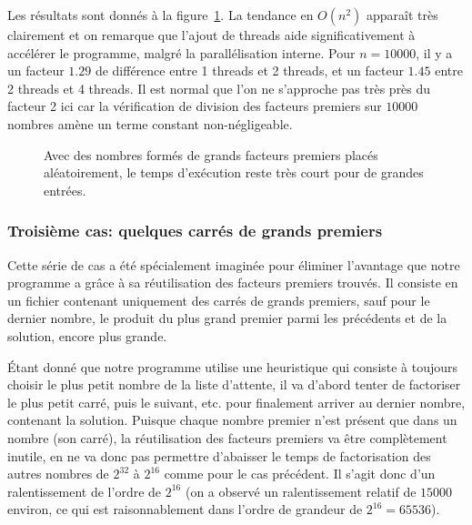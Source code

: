 \documentclass[a4paper,10pt]{article}
\begin{document}
Les résultats sont donnés à la figure~\ref{fig:large-primes}. La tendance en $O(n^2)$ apparaît très clairement et on remarque que l'ajout de threads aide significativement à accélérer le programme, malgré la parallélisation interne. Pour $n=10000$, il y a un facteur $1.29$ de différence entre 1 threads et 2 threads, et un facteur $1.45$ entre 2 threads et 4 threads. Il est normal que l'on ne s'approche pas très près du facteur 2 ici car la vérification de division des facteurs premiers sur $10000$ nombres amène un terme constant non-négligeable.

\begin{figure}[t!]
    \centering
    \caption{Avec des nombres formés de grands facteurs premiers placés aléatoirement, le temps d'exécution reste très court pour de grandes entrées.}
    \label{fig:large-primes}
\end{figure}

\newpage
\subsubsection*{Troisième cas: quelques carrés de grands premiers}

Cette série de cas a été spécialement imaginée pour éliminer l'avantage que notre programme a grâce à sa réutilisation des facteurs premiers trouvés. Il consiste en un fichier contenant uniquement des carrés de grands premiers, sauf pour le dernier nombre, le produit du plus grand premier parmi les précédents et de la solution, encore plus grande.

Étant donné que notre programme utilise une heuristique qui consiste à toujours choisir le plus petit nombre de la liste d'attente, il va d'abord tenter de factoriser le plus petit carré, puis le suivant, etc. pour finalement arriver au dernier nombre, contenant la solution. Puisque chaque nombre premier n'est présent que dans un nombre (son carré), la réutilisation des facteurs premiers va être complètement inutile, en ne va donc pas permettre d'abaisser le temps de factorisation des autres nombres de $2^{32}$ à $2^{16}$ comme pour le cas  précédent. Il s'agit donc d'un ralentissement de l'ordre de $2^{16}$ (on a observé un ralentissement relatif de $15000$ environ, ce qui est raisonnablement dans l'ordre de grandeur de $2^{16}=65536$).
\end{document}
